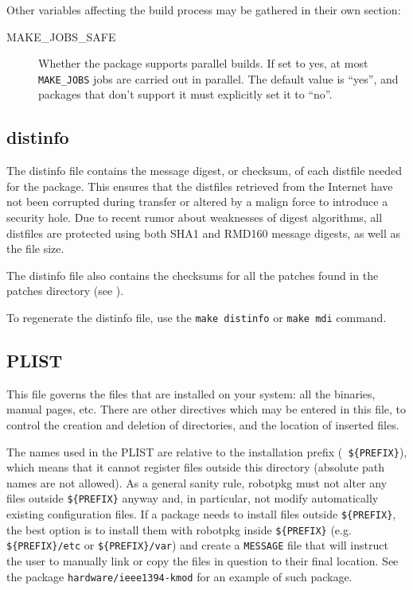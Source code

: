 Other variables affecting the build process may be gathered in their own
section:

\begin{description}

   \item[MAKE\_JOBS\_SAFE] Whether the package supports parallel builds. If set
   to yes, at most {\tt MAKE\_JOBS} jobs are carried out in parallel. The
   default value is ``yes'', and packages that don't support it must explicitly
   set it to ``no''.

\end{description}


\subsection{distinfo} %
\label{subsection:distinfo}

The distinfo file contains the message digest, or checksum, of each distfile
needed for the package. This ensures that the distfiles retrieved from the
Internet have not been corrupted during transfer or altered by a malign force
to introduce a security hole. Due to recent rumor about weaknesses of digest
algorithms, all distfiles are protected using both SHA1 and RMD160 message
digests, as well as the file size.

The distinfo file also contains the checksums for all the patches found in the
patches directory (see
).

To regenerate the distinfo file, use the {\tt make distinfo} or {\tt make mdi}
command.


\subsection{PLIST}
\label{subsection:PLIST}

This  file  governs the  files  that  are installed  on  your  system: all  the
binaries, manual pages, etc. There are other directives which may be entered in
this  file,  to control  the  creation and  deletion  of  directories, and  the
location of inserted files.

The  names used  in the  PLIST are  relative to  the installation  prefix ({\tt
\$\{PREFIX\}}),  which  means  that  it  cannot  register  files  outside  this
directory  (absolute path names  are not  allowed). As  a general  sanity rule,
robotpkg must  not alter  any files outside  {\tt \$\{PREFIX\}} anyway  and, in
particular, not modify automatically existing configuration files. If a package
needs  to install  files  outside {\tt  \$\{PREFIX\}},  the best  option is  to
install   them   with   robotpkg   inside  {\tt   \$\{PREFIX\}}   (e.g.    {\tt
\$\{PREFIX\}/etc} or  {\tt \$\{PREFIX\}/var}) and  create a {\tt  MESSAGE} file
that will instruct the  user to manually link or copy the  files in question to
their final location. See the package {\tt hardware/ieee1394-kmod} for an
example of such package.

